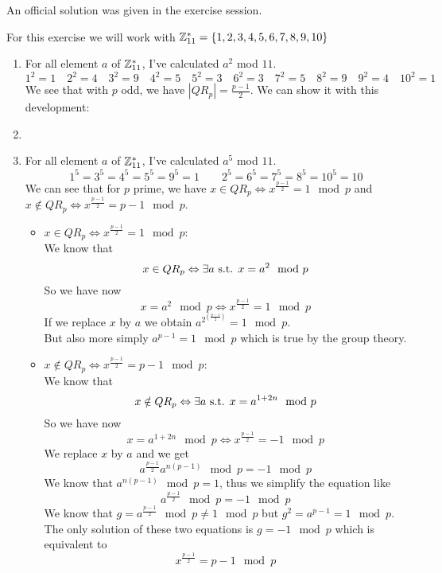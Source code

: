 \begin{solution}
	An official solution was given in the exercise session.

	For this exercise we will work with $\mathbb{Z}_{11}^* = \{1,2,3,4,5,6,7,8,9,10\}$
	\begin{enumerate}
		\item
		For all element $a$ of $\mathbb{Z}_{11}^*$, I've calculated $a^2$ mod $11$.
		\[1^2 = 1 \quad 2^2 = 4 \quad 3^2 = 9 \quad 4^2 = 5 \quad 5^2 = 3 \quad 6^2 = 3 \quad 7^2 = 5 \quad 8^2 = 9 \quad 9^2 = 4 \quad 10^2 = 1\]
		We see that with $p$ odd, we have $\left|QR_p\right| = \frac{p-1}{2}$. We can show it with this development:

		\item
		\nosubsolution

		\item
		For all element $a$ of $\mathbb{Z}_{11}^*$, I've calculated $a^5$ mod $11$.
		\[1^5 = 3^5 = 4^5 = 5^5 = 9^5 = 1 \qquad 2^5 = 6^5 = 7^5 = 8^5 = 10^5 = 10\]
		We can see that for $p$ prime, we have $x \in QR_p \Leftrightarrow x^{\frac{p-1}{2}} = 1 \mod p$ and  $x \notin QR_p \Leftrightarrow x^{\frac{p-1}{2}} = p-1 \mod p$.
		\begin{itemize}
			\item $x \in QR_p \Leftrightarrow x^{\frac{p-1}{2}} = 1 \mod p$:\\
			We know that \[x \in QR_p \Leftrightarrow \exists a \text{ s.t. } x = a^2 \mod p\]
			So we have now \[x = a^2 \mod p \Leftrightarrow x^{\frac{p-1}{2}} = 1 \mod p\]
			If we replace $x$ by $a$ we obtain $a^{2^{(\frac{p-1}{2})}} = 1 \mod p$.\\
			But also more simply $a^{p-1} = 1 \mod p$ which is true by the group theory.
			\item $x \notin QR_p \Leftrightarrow x^{\frac{p-1}{2}} = p-1 \mod p$:\\
			We know that \[x \notin QR_p \Leftrightarrow \exists a \text{ s.t. } x = a^{1+2n} \mod p\]
			So we have now \[x = a^{1+2n} \mod p \Leftrightarrow x^{\frac{p-1}{2}} = -1 \mod p\]
			We replace $x$ by $a$ and we get \[a^{\frac{p-1}{2}} a^{n(p-1)} \mod p = -1 \mod p\]
			We know that $ a^{n(p-1)} \mod p = 1$, thus we simplify the equation like \[a^{\frac{p-1}{2}} \mod p = -1 \mod p\]
			We know that $g = a^{\frac{p-1}{2}} \mod p \ne 1 \mod p$ but $g^2 = a^{p-1} = 1 \mod p$. The only solution of these two equations is $g = -1 \mod p$ which is equivalent to
			\[x^{\frac{p-1}{2}} = p-1 \mod p\]
		\end{itemize}


\end{enumerate}
\end{solution}

